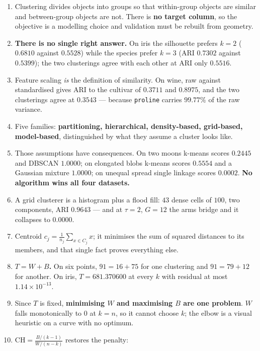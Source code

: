\documentclass[11pt]{article}
\begin{document}
\begin{enumerate}[leftmargin=*]
  \item Clustering divides objects into groups so that within-group objects
    are similar and between-group objects are not. There is \textbf{no target
    column}, so the objective is a modelling choice and validation must be
    rebuilt from geometry.
  \item \textbf{There is no single right answer.} On iris the silhouette
    prefers $k = 2$ ($0.6810$ against $0.5528$) while the species prefer
    $k = 3$ (ARI $0.7302$ against $0.5399$); the two clusterings agree with
    each other at ARI only $\mathbf{0.5516}$.
  \item Feature scaling \emph{is} the definition of similarity. On wine, raw
    against standardised gives ARI to the cultivar of $0.3711$ and
    $\mathbf{0.8975}$, and the two clusterings agree at $0.3543$ --- because
    \texttt{proline} carries $99.77\%$ of the raw variance.
  \item Five families: \textbf{partitioning, hierarchical, density-based,
    grid-based, model-based}, distinguished by what they assume a cluster
    looks like.
  \item Those assumptions have consequences. On two moons k-means scores
    $\mathbf{0.2445}$ and DBSCAN $\mathbf{1.0000}$; on elongated blobs
    k-means scores $0.5554$ and a Gaussian mixture $1.0000$; on unequal
    spread single linkage scores $\mathbf{0.0002}$. \textbf{No algorithm wins
    all four datasets.}
  \item A grid clusterer is a histogram plus a flood fill: $43$ dense cells of
    $100$, two components, ARI $0.9643$ --- and at $\tau = 2$, $G = 12$ the
    arms bridge and it collapses to $\mathbf{0.0000}$.
  \item Centroid $c_j = \frac{1}{n_j}\sum_{x \in C_j} x$; it minimises the sum
    of squared distances to its members, and that single fact proves
    everything else.
  \item \textbf{$T = W + B$.} On six points, $91 = 16 + 75$ for one clustering
    and $91 = 79 + 12$ for another. On iris, $T = 681.370600$ at every $k$
    with residual at most $1.14 \times 10^{-13}$.
  \item Since $T$ is fixed, \textbf{minimising $W$ and maximising $B$ are one
    problem}. $W$ falls monotonically to $0$ at $k = n$, so it cannot choose
    $k$; the elbow is a visual heuristic on a curve with no optimum.
  \item $\mathrm{CH} = \frac{B/(k-1)}{W/(n-k)}$ restores the penalty:

\end{enumerate}
\end{document}
